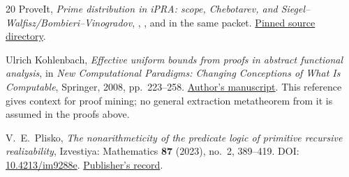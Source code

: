 \begin{thebibliography}{20}
ProveIt, \emph{Prime distribution in iPRA: scope, Chebotarev, and
Siegel--Walfisz/Bombieri--Vinogradov},
,
, and
 in the same packet.
\href{https://github.com/VladimirReshetnikov/ProveIt/tree/42c64ff3a9f56f2a9edc1525e75ece3b720c7f77/Logic/PrimitiveRecursiveArithmetic/docs/proofs/analytic-number-theory/prime_distribution_ipra}{Pinned source directory}.

Ulrich Kohlenbach, \emph{Effective uniform bounds from proofs in abstract
functional analysis}, in \emph{New Computational Paradigms: Changing
Conceptions of What Is Computable}, Springer, 2008, pp.~223--258.
\href{https://www2.mathematik.tu-darmstadt.de/~kohlenbach/cie-proceedings.pdf}{Author's manuscript}.
This reference gives context for proof mining; no general extraction
metatheorem from it is assumed in the proofs above.

V.~E.~Plisko, \emph{The nonarithmeticity of the predicate logic of primitive
recursive realizability}, Izvestiya: Mathematics \textbf{87} (2023), no.~2,
389--419. DOI: \href{https://doi.org/10.4213/im9288e}{10.4213/im9288e}.
\href{https://www.mathnet.ru/eng/im9288}{Publisher's record}.
\end{thebibliography}
